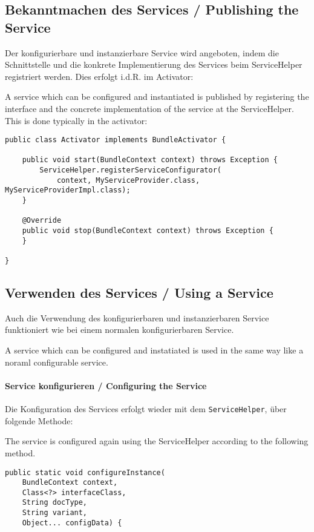 \documentclass[10pt,a4paper]{scrartcl}
\providecommand{\deng}[2]{#1 / {\sffamily #2}}
\providecommand{\deutsch}[1]{#1}
\providecommand{\englisch}[1]{{\sffamily #1}}
\begin{document}
\subsection{\deng{Bekanntmachen des Services}{Publishing the Service}}
\deutsch{Der konfigurierbare und instanzierbare Service wird angeboten, indem
die Schnittstelle und die konkrete Implementierung des Services beim
ServiceHelper registriert werden. Dies erfolgt i.d.R. im Activator:}

\englisch{A service which can be configured and instantiated is published by
registering the interface and the concrete implementation of the service at the 
ServiceHelper. This is done typically in the activator:}

\begin{lstlisting}
public class Activator implements BundleActivator {

	public void start(BundleContext context) throws Exception {
		ServiceHelper.registerServiceConfigurator(
			context, MyServiceProvider.class, MyServiceProviderImpl.class);
	}
	
	@Override
	public void stop(BundleContext context) throws Exception {
	}

}
\end{lstlisting}


\subsection{\deng{Verwenden des Services}{Using a Service}}
\deutsch{Auch die Verwendung des konfigurierbaren und instanzierbaren Service
funktioniert wie bei einem normalen konfigurierbaren Service.}

\englisch{A service which can be configured and instatiated is used in the same
way like a noraml configurable service.}

\paragraph{\deng{Service konfigurieren}{Configuring the Service}}
\deutsch{Die Konfiguration des Services erfolgt wieder mit dem
\texttt{ServiceHelper}, über folgende Methode:}

\englisch{The service is configured again using the ServiceHelper according to
the following method.}

\begin{lstlisting}
public static void configureInstance(
	BundleContext context, 
	Class<?> interfaceClass, 
	String docType, 
	String variant, 
	Object... configData) {
\end{lstlisting}
\end{document}
